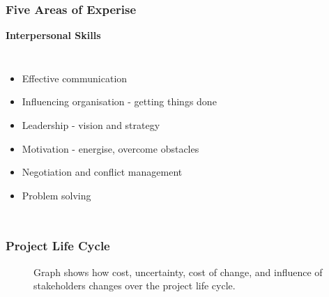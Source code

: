 \documentclass{beamer}
\begin{document}
\begin{frame}
\frametitle{Five Areas of Experise}
\textbf{Interpersonal Skills}\\
\vspace{0.5cm}
\begin{columns}[t]
\begin{itemize}
\item Effective communication
\item Influencing organisation - getting things done
\item Leadership - vision and strategy
\item Motivation - energise, overcome obstacles
\item Negotiation and conflict management
\item Problem solving
\end{itemize}

\begin{figure}
\end{figure}
\end{columns}
\end{frame}

\begin{frame}
\frametitle{Project Life Cycle}
\begin{figure}
\caption{Graph shows how cost, uncertainty, cost of change, and influence of stakeholders changes over the project life cycle.}
\end{figure}
\end{frame}
\end{document}
